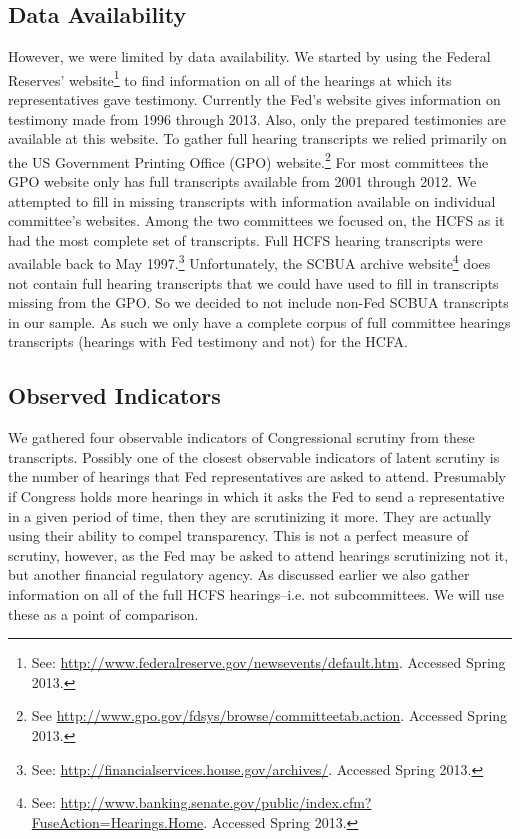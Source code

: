 \documentclass[a4paper]{article}\usepackage[]{graphicx}\usepackage[]{color}
\begin{document}
\subsection{Data Availability}

However, we were limited by data availability. We started by using the Federal Reserves' website\footnote{See: \url{http://www.federalreserve.gov/newsevents/default.htm}. Accessed Spring 2013.} to find information on all of the hearings at which its representatives gave testimony. Currently the Fed's website gives information on testimony made from 1996 through 2013. Also, only the prepared testimonies are available at this website. To gather full hearing transcripts we relied primarily on the US Government Printing Office (GPO) website.\footnote{See \url{http://www.gpo.gov/fdsys/browse/committeetab.action}. Accessed Spring 2013.} For most committees the GPO website only has full transcripts available from 2001 through 2012. We attempted to fill in missing transcripts with information available on individual committee's websites. Among the two committees we focused on, the HCFS as it had the most complete set of transcripts. Full HCFS hearing transcripts were available back to May 1997.\footnote{See: \url{http://financialservices.house.gov/archives/}. Accessed Spring 2013.} Unfortunately, the SCBUA archive website\footnote{See: \url{http://www.banking.senate.gov/public/index.cfm?FuseAction=Hearings.Home}. Accessed Spring 2013.} does not contain full hearing transcripts that we could have used to fill in transcripts missing from the GPO. So we decided to not include non-Fed SCBUA transcripts in our sample. As such we only have a complete corpus of full committee hearings transcripts (hearings with Fed testimony and not) for the HCFA.

\subsection{Observed Indicators}

We gathered four observable indicators of Congressional scrutiny from these transcripts. Possibly one of the closest observable indicators of latent scrutiny is the number of hearings that Fed representatives are asked to attend. Presumably if Congress holds more hearings in which it asks the Fed to send a representative in a given period of time, then they are scrutinizing it more. They are actually using their ability to compel transparency. This is not a perfect measure of scrutiny, however, as the Fed may be asked to attend hearings scrutinizing not it, but another financial regulatory agency. As discussed earlier we also gather information on all of the full HCFS hearings--i.e. not subcommittees. We will use these as a point of comparison.
\end{document}

